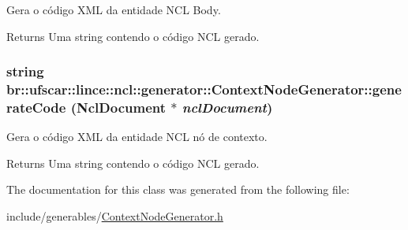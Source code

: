 Gera o código XML da entidade NCL Body. 

\begin{DoxyReturn}{Returns}
Uma string contendo o código NCL gerado. 
\end{DoxyReturn}
\hypertarget{classbr_1_1ufscar_1_1lince_1_1ncl_1_1generator_1_1ContextNodeGenerator_af73e1f1278fd33b57e9c5b7b89b3c858}{
\subsubsection[{generateCode}]{\setlength{\rightskip}{0pt plus 5cm}string br::ufscar::lince::ncl::generator::ContextNodeGenerator::generateCode (NclDocument $\ast$ {\em nclDocument})}}
\label{classbr_1_1ufscar_1_1lince_1_1ncl_1_1generator_1_1ContextNodeGenerator_af73e1f1278fd33b57e9c5b7b89b3c858}


Gera o código XML da entidade NCL nó de contexto. 

\begin{DoxyReturn}{Returns}
Uma string contendo o código NCL gerado. 
\end{DoxyReturn}


The documentation for this class was generated from the following file:\begin{DoxyCompactItemize}
\item 
include/generables/\hyperlink{ContextNodeGenerator_8h}{ContextNodeGenerator.h}\end{DoxyCompactItemize}
